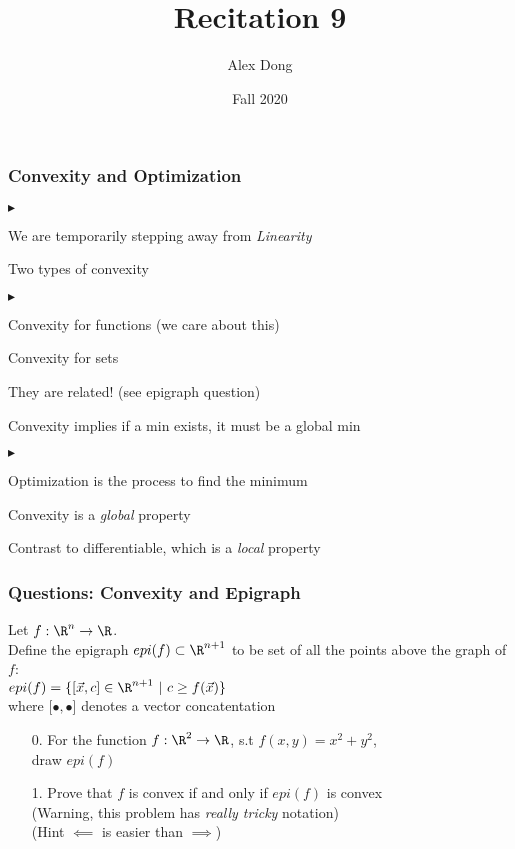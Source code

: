 \documentclass{beamer}
\title{Recitation 9}
\author{Alex Dong}
\institute{CDS, NYU}
\date{Fall 2020}
\renewenvironment{itemize}
\renewenvironment{enumerate}%
{\begin{list}{\arabic{enumi}.}%
      {\setlength{\leftmargin}{2.5em}%
       \setlength{\itemsep}{-\parsep}%
       \setlength{\topsep}{-\parskip}%
       \usecounter{enumi}}%
 }{\end{list}}
\renewenvironment{itemize}%
{\begin{list}{$\blacktriangleright$}%
      {\setlength{\leftmargin}{2.5em}%
       \setlength{\itemsep}{-\parsep}%
       \setlength{\topsep}{-\parskip}%
       \usecounter{enumi}}%
 }{\end{list}}
\newcommand{\x}{\vec{x} }
\begin{document}
\frame{\titlepage} 

\begin{frame}
\frametitle{Convexity and Optimization}
\begin{itemize}
\item We are temporarily stepping away from \textit{Linearity}
\item Two types of convexity
\begin{itemize}
\item Convexity for functions (we care about this)
\item Convexity for sets
\item They are related! (see epigraph question)
\end{itemize}
\item Convexity implies if a min exists, it must be a global min
\begin{itemize}
\item Optimization is the process to find the minimum
\end{itemize}
\item Convexity is a \textit{global} property
\item Contrast to differentiable, which is a \textit{local} property
\end{itemize}
\end{frame}

\begin{frame}
\frametitle{Questions: Convexity and Epigraph}
Let $f: \R^n \rightarrow \R$.\\
Define the epigraph $epi(f)\subset \R^{n+1}$ to be set of all the points above the graph of $f$:\\
\quad $epi(f) = \{[\x,c] \in \R^{n+1}\ |\ c \geq f(\x) \}$ \\
where [$\bullet,\bullet$] denotes a vector concatentation\\

\begin{enumerate}
\item[0.] For the function  $f: \R^2 \rightarrow \R$, s.t $f(x,y)=x^2+y^2$,\\ draw $epi(f)$
\medskip
\item[1.] Prove that $f$ is convex if and only if $epi(f)$ is convex\\
(Warning, this problem has \textit{really tricky} notation)\\
(Hint $\impliedby$ is easier than $\implies$)
\end{enumerate}
\end{frame}
\end{document}
